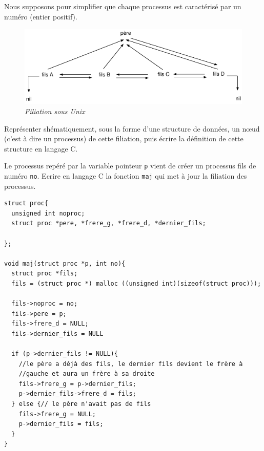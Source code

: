 \documentclass[10pt]{article}\usepackage[nu]{esial}
\begin{document}
Nous supposons pour simplifier que chaque processus est caractérisé
par un numéro (entier positif).


\bigskip\bigskip
\begin{figure}[h]
  \centerline{\includegraphics[width=\linewidth]{filiation.pdf}}
  \caption[]
	  {{\it Filiation sous Unix}}
	  \label{filiation}
\end{figure}
\bigskip

\Question  Représenter shématiquement, sous la
forme d'une structure de données, un n\oe ud (c'est à dire un
processus) de cette filiation, puis écrire la définition de cette
structure en langage C.

\Question  Le processus repéré par la variable
pointeur {\tt p} vient de créer un processus fils de numéro {\tt no}.
Ecrire en langage C la fonction {\tt maj} qui met à jour la filiation
des processus.

\begin{Reponse}
\vspace{-.7cm}
\begin{verbatim}
struct proc{
  unsigned int noproc;
  struct proc *pere, *frere_g, *frere_d, *dernier_fils;
  
};

void maj(struct proc *p, int no){
  struct proc *fils;
  fils = (struct proc *) malloc ((unsigned int)(sizeof(struct proc)));

  fils->noproc = no;
  fils->pere = p;
  fils->frere_d = NULL;
  fils->dernier_fils = NULL 

  if (p->dernier_fils != NULL){
    //le père a déjà des fils, le dernier fils devient le frère à
    //gauche et aura un frère à sa droite
    fils->frere_g = p->dernier_fils;
    p->dernier_fils->frere_d = fils;
  } else {// le père n'avait pas de fils
    fils->frere_g = NULL;
    p->dernier_fils = fils;
  } 
}
\end{verbatim}
~
\end{Reponse}
\end{document}
